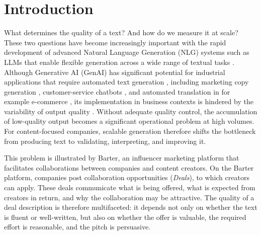 
\section{Introduction}

What determines the quality of a text? And how do we measure it at scale? These two questions have become increasingly important with the rapid development of advanced Natural Language Generation (NLG) systems  such as LLMs that enable flexible generation across a wide range of textual tasks \citep{zhaoSurveyLargeLanguage2026}. Although Generative AI (GenAI) has significant potential for industrial applications that require automated text generation \citep{razaIndustrialApplicationsLarge2025}, including marketing copy generation \citep{murakamiNaturalLanguageGeneration2023}, customer-service chatbots \citep{pandyaAutomatingCustomerService2023}, and automated translation in for example e-commerce \citep{gaoLLMsbasedMachineTranslation2024}, its implementation in business contexts is hindered by the variability of output quality \citep{fui-hoonnahGenerativeAIChatGPT2023}. Without adequate quality control, the accumulation of low-quality output becomes a significant operational problem at high volumes. For content-focused companies, scalable generation therefore shifts the bottleneck from producing text to validating, interpreting, and improving it.

This problem is illustrated by Barter, an influencer marketing platform that facilitates collaborations between companies and content creators. On the Barter platform, companies post collaboration opportunities (\textit{Deals}), to which creators can apply. These deals communicate what is being offered, what is expected from creators in return, and why the collaboration may be attractive. The quality of a deal description is therefore multifaceted: it depends not only on whether the text is fluent or well-written, but also on whether the offer is valuable, the required effort is reasonable, and the pitch is persuasive.

